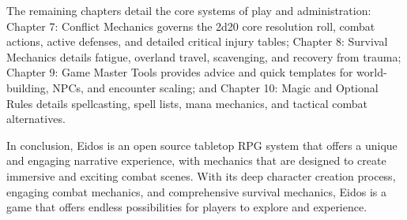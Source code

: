The remaining chapters detail the core systems of play and administration: Chapter 7: Conflict Mechanics governs the 2d20 core resolution roll, combat actions, active defenses, and detailed critical injury tables; Chapter 8: Survival Mechanics details fatigue, overland travel, scavenging, and recovery from trauma; Chapter 9: Game Master Tools provides advice and quick templates for world-building, NPCs, and encounter scaling; and Chapter 10: Magic and Optional Rules details spellcasting, spell lists, mana mechanics, and tactical combat alternatives.

In conclusion, Eidos is an open source tabletop RPG system that offers a unique and engaging narrative experience, with mechanics that are designed to create immersive and exciting combat scenes. With its deep character creation process, engaging combat mechanics, and comprehensive survival mechanics, Eidos is a game that offers endless possibilities for players to explore and experience.

